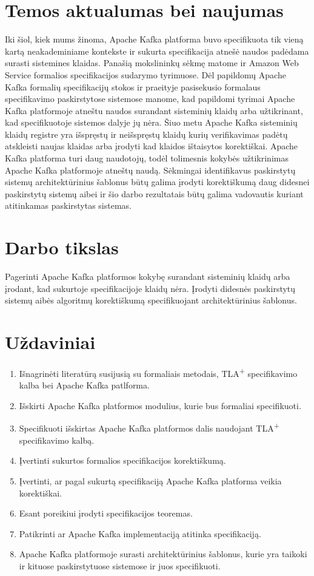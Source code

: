 \documentclass{VUMIFPSmagistrinis}
\begin{document}
	\section{Temos aktualumas bei naujumas}
		Iki šiol, kiek mums žinoma, Apache Kafka platforma buvo specifikuota tik vieną kartą neakademiniame kontekste ir sukurta specifikacija atnešė naudos padėdama surasti sistemines klaidas.
		Panašią mokslininkų sėkmę matome ir Amazon Web Service formalios specifikacijos sudarymo tyrimuose.
		Dėl papildomų Apache Kafka formalių specifikacijų stokos ir praeityje pasisekusio formalaus specifikavimo paskirstytose sistemose manome, kad papildomi tyrimai Apache Kafka platformoje atneštu naudos surandant sisteminių klaidų arba užtikrinant, kad specifikuotoje sistemos dalyje jų nėra.
		Šiuo metu Apache Kafka sisteminių klaidų registre yra išspręstų  ir neišspręstų  klaidų kurių verifikavimas padėtų atskleisti naujas klaidas arba įrodyti kad klaidos ištaisytos korektiškai.
		Apache Kafka platforma turi daug naudotojų, todėl tolimesnis kokybės užtikrinimas Apache Kafka platformoje atneštų naudą.
		Sėkmingai identifikavus paskirstytų sistemų architektūrinius šablonus būtų galima įrodyti korektiškumą daug didesnei paskirstytų sistemų aibei ir šio darbo rezultatais būtų galima vadovautis kuriant atitinkamas paskirstytas sistemas. 
	
	\section{Darbo tikslas}
		Pagerinti Apache Kafka platformos kokybę surandant sisteminių klaidų arba įrodant, kad sukurtoje specifikacijoje klaidų nėra.
		Įrodyti didesnės paskirstytų sistemų aibės algoritmų korektiškumą specifikuojant architektūrinius šablonus.
	
	\section{Uždaviniai}
		\begin{enumerate}
			\item{Išnagrinėti literatūrą susijusią su formaliais metodais, TLA\textsuperscript{+} specifikavimo kalba bei Apache Kafka patlforma.}
			\item{Išskirti Apache Kafka platformos modulius, kurie bus formaliai specifikuoti.}
			\item{Specifikuoti išskirtas Apache Kafka platformos dalis naudojant TLA\textsuperscript{+} specifikavimo kalbą.}
			\item{Įvertinti sukurtos formalios specifikacijos korektiškumą.}
			\item{Įvertinti, ar pagal sukurtą specifikaciją Apache Kafka platforma veikia korektiškai.}
			\item{Esant poreikiui įrodyti specifikacijos teoremas.}
			\item{Patikrinti ar Apache Kafka implementaciją atitinka specifikaciją.}
			\item{Apache Kafka platformoje surasti architektūrinius šablonus, kurie yra taikoki ir kituose paskirstytuose sistemose ir juos specifikuoti.}
		\end{enumerate}
	
\end{document}

